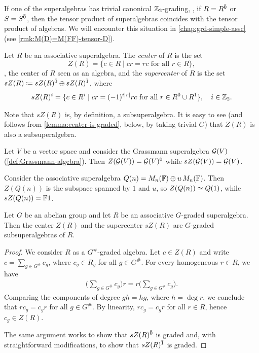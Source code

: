If one of the superalgebras has trivial canonical $\mathbb{Z}_2$-grading, \ie, if $R = R^{\bar0}$ or $S = S^{\bar0}$, then the tensor product of superalgebras coincides with the tensor product of algebras. 
We will encounter this situation in \cref{chap:grd-simple-assc} (see \cref{rmk:M(D)=M(FF)-tensor-D}). 



\begin{defi}\label{defi:center}
	Let $R$ be an associative superalgebra.
	The \emph{center} of $R$ is the set
	\[
		Z(R) = \{c\in R \mid cr = rc \text{ for all } r\in R \},
	\]
	\ie, the center of $R$ seen as an algebra, and the \emph{supercenter} of $R$ is the set $sZ(R) \coloneqq sZ(R)^{\bar0} \oplus sZ(R)^{\bar1}$, where
	\begin{align*}
		sZ(R)^i = \{c\in R^i \mid cr = (-1)^{i |r|} rc \text{ for all } r\in R^{\bar0}\cup R^{\bar1} \},\quad i \in \mathbb{Z}_2.
	\end{align*}
\end{defi}

Note that $sZ(R)$ is, by definition, a subsuperalgebra. 
It is easy to see (and follows from \cref{lemma:center-is-graded}, below, by taking trivial $G$) that $Z(R)$ is also a subsuperalgebra. 

\begin{ex}
    Let $V$ be a vector space and consider the Grassmann superalgebra $\mathcal G (V)$ (\cref{def:Grassmann-algebra}). 
    Then $Z(\mathcal G (V)) = \mathcal G (V)^{\bar0}$ while $sZ(\mathcal G (V)) = \mathcal G (V)$. 
\end{ex}

\begin{ex}
    Consider the associative superalgebra $Q(n) = M_n (\mathbb{F}) \oplus u \, M_n(\mathbb{F})$. 
    Then $Z(Q(n))$ is the subspace spanned by $1$ and $u$,
    so $Z(Q(n)) \simeq Q(1)$, while $sZ(Q(n)) = \mathbb{F} 1$.
\end{ex}

\begin{lemma}\label{lemma:center-is-graded}
	Let $G$ be an abelian group and let $R$ be an associative $G$-graded superalgebra.
	Then the center $Z(R)$ and the supercenter $sZ(R)$ are $G$-graded subsuperalgebras of $R$.
\end{lemma}

\begin{proof}
	We consider $R$ as a $G^\#$-graded algebra.
	Let $c \in Z(R)$ and write $c = \sum_{g \in G^\#} c_g$, where $c_g \in R_g$ for all $g \in G^\#$.
	For every homogeneous $r \in R$, we have
	\begin{align*}
		\big(\sum_{g\in G^\#} c_g\big)r = r \big(\sum_{g\in G^\#} c_g\big).
	\end{align*}
	Comparing the components of degree $gh = hg$, where $h = \deg r$, we conclude that $rc_g = c_g r$ for all $g \in G^\#$.
	By linearity, $r c_g = c_g r$ for all $r\in R$, hence $c_g \in Z(R)$.

	The same argument works to show that $sZ(R)^{\bar0}$ is graded and, with straightforward modifications, to show that $sZ(R)^{\bar1}$ is graded.
\end{proof}

